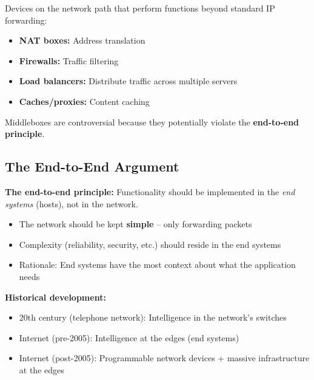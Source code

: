 \begin{keybox}[Middleboxes]
Devices on the network path that perform functions beyond standard IP forwarding:
\begin{itemize}[noitemsep]
    \item \textbf{NAT boxes:} Address translation
    \item \textbf{Firewalls:} Traffic filtering
    \item \textbf{Load balancers:} Distribute traffic across multiple servers
    \item \textbf{Caches/proxies:} Content caching
\end{itemize}

Middleboxes are controversial because they potentially violate the \textbf{end-to-end principle}.
\end{keybox}

\subsection{The End-to-End Argument}

\begin{keybox}
\textbf{The end-to-end principle:} Functionality should be implemented in the \emph{end systems} (hosts), not in the network.

\begin{itemize}[noitemsep]
    \item The network should be kept \textbf{simple} -- only forwarding packets
    \item Complexity (reliability, security, etc.) should reside in the end systems
    \item Rationale: End systems have the most context about what the application needs
\end{itemize}

\textbf{Historical development:}
\begin{itemize}[noitemsep]
    \item 20th century (telephone network): Intelligence in the network's switches
    \item Internet (pre-2005): Intelligence at the edges (end systems)
    \item Internet (post-2005): Programmable network devices + massive infrastructure at the edges
\end{itemize}
\end{keybox}


